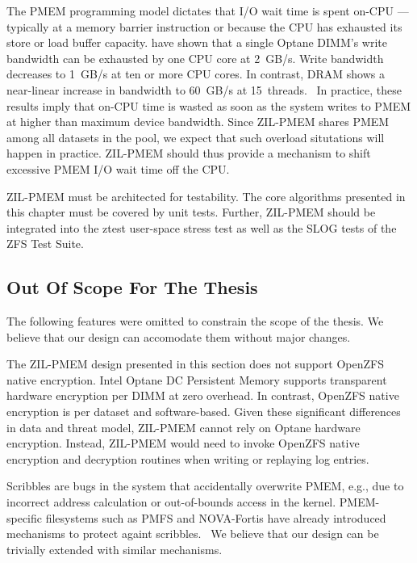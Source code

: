 \documentclass[12pt,a4paper,twoside]{book}
\begin{document}
The PMEM programming model dictates that I/O wait time is spent on-CPU --- typically at a memory barrier instruction or because the CPU has exhausted its store or load buffer capacity.
\citeauthor{yangEmpiricalGuideBehavior2020} have shown that a single Optane DIMM's write bandwidth can be exhausted by one CPU core at \SI{2}{GB/s}.
Write bandwidth decreases to \SI{1}{GB/s} at ten or more CPU cores.
In contrast, DRAM shows a near-linear increase in bandwidth to \SI{60}{GB/s} at 15~threads.~\cite[fig.4]{yangEmpiricalGuideBehavior2020}
In practice, these results imply that on-CPU time is wasted as soon as the system writes to PMEM at higher than maximum device bandwidth.
Since ZIL-PMEM shares PMEM among all datasets in the pool, we expect that such overload situtations will happen in practice.
ZIL-PMEM should thus provide a mechanism to shift excessive PMEM I/O wait time off the CPU.

ZIL-PMEM must be architected for testability.
The core algorithms presented in this chapter must be covered by unit tests.
Further, ZIL-PMEM should be integrated into the ztest user-space stress test as well as the SLOG tests of the ZFS Test Suite.

\subsection{Out Of Scope For The Thesis}
The following features were omitted to constrain the scope of the thesis.
We believe that our design can accomodate them without major changes.

The ZIL-PMEM design presented in this section does not support OpenZFS native encryption.
Intel Optane DC Persistent Memory supports transparent hardware encryption per DIMM at zero overhead.
In contrast, OpenZFS native encryption is per dataset and software-based.
Given these significant differences in data and threat model, ZIL-PMEM cannot rely on Optane hardware encryption.
Instead, ZIL-PMEM would need to invoke OpenZFS native encryption and decryption routines when writing or replaying log entries.

Scribbles are bugs in the system that accidentally overwrite PMEM, e.g., due to incorrect address calculation or out-of-bounds access in the kernel.
PMEM-specific filesystems such as PMFS and NOVA-Fortis have already introduced mechanisms to protect againt scribbles.~\cite{dulloorSystemSoftwarePersistent2014,xuNOVAFortisFaulttolerantNonvolatile2017}
We believe that our design can be trivially extended with similar mechanisms.
\end{document}

